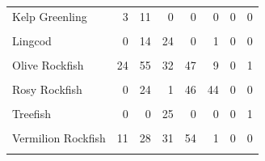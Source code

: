 \documentclass[
]{article}
\begin{document}
\begin{table}
\begin{tabular}[t]{lrrrrrrr}
Kelp Greenling & 3 & 11 & 0 & 0 & 0 & 0 & 0\\
\cellcolor{gray!6}{Kelp Rockfish} & \cellcolor{gray!6}{0} & \cellcolor{gray!6}{17} & \cellcolor{gray!6}{10} & \cellcolor{gray!6}{0} & \cellcolor{gray!6}{0} & \cellcolor{gray!6}{0} & \cellcolor{gray!6}{1}\\
Lingcod & 0 & 14 & 24 & 0 & 1 & 0 & 0\\
\cellcolor{gray!6}{Olive or Yellowtail Rockfish} & \cellcolor{gray!6}{0} & \cellcolor{gray!6}{0} & \cellcolor{gray!6}{1} & \cellcolor{gray!6}{0} & \cellcolor{gray!6}{0} & \cellcolor{gray!6}{0} & \cellcolor{gray!6}{0}\\
\addlinespace
Olive Rockfish & 24 & 55 & 32 & 47 & 9 & 0 & 1\\
\cellcolor{gray!6}{Quillback Rockfish} & \cellcolor{gray!6}{0} & \cellcolor{gray!6}{0} & \cellcolor{gray!6}{0} & \cellcolor{gray!6}{63} & \cellcolor{gray!6}{19} & \cellcolor{gray!6}{0} & \cellcolor{gray!6}{0}\\
Rosy Rockfish & 0 & 24 & 1 & 46 & 44 & 0 & 0\\
\cellcolor{gray!6}{Starry Rockfish} & \cellcolor{gray!6}{0} & \cellcolor{gray!6}{0} & \cellcolor{gray!6}{1} & \cellcolor{gray!6}{4} & \cellcolor{gray!6}{0} & \cellcolor{gray!6}{0} & \cellcolor{gray!6}{1}\\
Treefish & 0 & 0 & 25 & 0 & 0 & 0 & 1\\
\addlinespace
\cellcolor{gray!6}{UnID Blue Rockfish} & \cellcolor{gray!6}{0} & \cellcolor{gray!6}{0} & \cellcolor{gray!6}{0} & \cellcolor{gray!6}{0} & \cellcolor{gray!6}{1} & \cellcolor{gray!6}{0} & \cellcolor{gray!6}{0}\\
Vermilion Rockfish & 11 & 28 & 31 & 54 & 1 & 0 & 0\\
\cellcolor{gray!6}{Yellowtail Rockfish} & \cellcolor{gray!6}{36} & \cellcolor{gray!6}{19} & \cellcolor{gray!6}{13} & \cellcolor{gray!6}{120} & \cellcolor{gray!6}{27} & \cellcolor{gray!6}{0} & \cellcolor{gray!6}{0}\\
\bottomrule
\end{tabular}
\end{table}

\clearpage
\newpage
\end{document}
